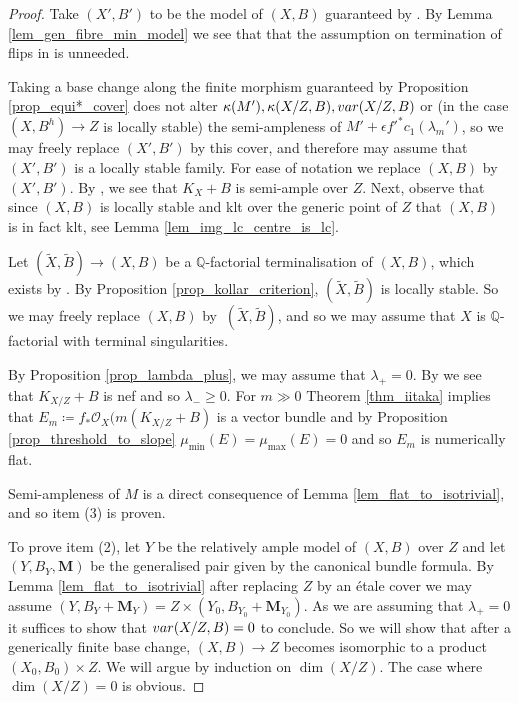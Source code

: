 \documentclass[12pt]{amsart}
\theoremstyle{plain}
\theoremstyle{definition}
\def\QQ{\mathbb Q}
\def\dim{\operatorname{dim}}
\begin{document}
\begin{proof}
Take $(X', B')$ to be the model of $(X, B)$ guaranteed by \cite[Theorem 1.1]{ACSS}.
By Lemma \ref{lem_gen_fibre_min_model} we see that that the assumption on termination of flips in 
\cite[Theorem 1.1]{ACSS} is unneeded.

Taking a base change along the finite morphism guaranteed by Proposition \ref{prop_equi*_cover}
does not alter $\kappa(M'), \kappa(X/Z, B), {\rm var}(X/Z, B)$ or (in the case $(X, B^h) \to Z$ is locally stable) the semi-ampleness of 
$M'+\epsilon f'^*c_1(\lambda_m')$, so we may freely replace
$(X', B')$ by this cover, and therefore may assume that $(X', B')$ is a locally stable family.
For ease of notation we replace $(X, B)$ by $(X', B')$.
By \cite[Theorem 1.1]{HX11}, 
we see that $K_{X}+B$ is semi-ample over $Z$.
Next, observe that since $(X, B)$ is locally stable and klt over the generic point of $Z$ that
$(X, B)$ is in fact klt, see Lemma \ref{lem_img_lc_centre_is_lc}.

Let $(\tilde{X}, \tilde{B}) \rightarrow (X, B)$ be a $\mathbb Q$-factorial terminalisation of $(X, B)$, 
which exists by \cite[Corollary 1.4.3]{BCHM06}.
By Proposition \ref{prop_kollar_criterion}, $(\tilde{X}, \tilde{B})$ is locally stable. 
So we may freely replace $(X, B)$ by 
$~(\tilde{X}, \tilde{B})$, and so we may assume 
that $X$ is $\QQ$-factorial with terminal singularities.

By Proposition \ref{prop_lambda_plus}, we may assume that $\lambda_+ = 0$.  By \cite[Proposition 4.1]{ACSS} 
we see that $K_{X/Z}+B$ is nef and so $\lambda_- \geq 0$.
For $m \gg 0$ Theorem \ref{thm_iitaka} implies that $E_m \coloneqq f_*\mathcal O_X(m(K_{X/Z}+B)$ is a vector bundle and by 
Proposition \ref{prop_threshold_to_slope} $\mu_{\min}(E) = \mu_{\max}(E) = 0$ and 
so $E_m$ is numerically flat.

Semi-ampleness of $M$ is a direct consequence of Lemma \ref{lem_flat_to_isotrivial}, 
and so item (3) is proven.


To prove item (2), let $Y$ be the relatively ample model of $(X, B)$ over $Z$ and let $(Y, B_Y, \mathbf{M})$
be the generalised pair given by the canonical bundle formula. 
By Lemma \ref{lem_flat_to_isotrivial} 
after replacing 
$Z$ by an \'etale cover we may assume $(Y, B_Y+\mathbf{M}_Y) = Z \times (Y_0, B_{Y_0}+\mathbf{M}_{Y_0})$.
As we are assuming that $\lambda_+ = 0$ it suffices to show that ${\rm var}(X/Z, B) = 0$ 
to conclude.
So we will show that after a generically finite base change, 
$(X, B) \rightarrow Z$
becomes isomorphic to a product $(X_0, B_0)\times Z$.  
We will argue by induction on $\dim (X/Z)$.
The case where $\dim (X/Z) = 0$ is obvious.



\end{proof}
\end{document}
